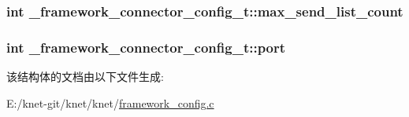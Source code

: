 \subsubsection[{max\+\_\+send\+\_\+list\+\_\+count}]{\setlength{\rightskip}{0pt plus 5cm}int \+\_\+framework\+\_\+connector\+\_\+config\+\_\+t\+::max\+\_\+send\+\_\+list\+\_\+count}\label{a00011_ac6e964a4a4ca24a176016275955a4e05_ac6e964a4a4ca24a176016275955a4e05}
\hypertarget{a00011_a5427527be42630baf3fc0497e74e4d4d_a5427527be42630baf3fc0497e74e4d4d}{}
\subsubsection[{port}]{\setlength{\rightskip}{0pt plus 5cm}int \+\_\+framework\+\_\+connector\+\_\+config\+\_\+t\+::port}\label{a00011_a5427527be42630baf3fc0497e74e4d4d_a5427527be42630baf3fc0497e74e4d4d}


该结构体的文档由以下文件生成\+:\begin{DoxyCompactItemize}
\item 
E\+:/knet-\/git/knet/knet/\hyperlink{a00054}{framework\+\_\+config.\+c}\end{DoxyCompactItemize}
